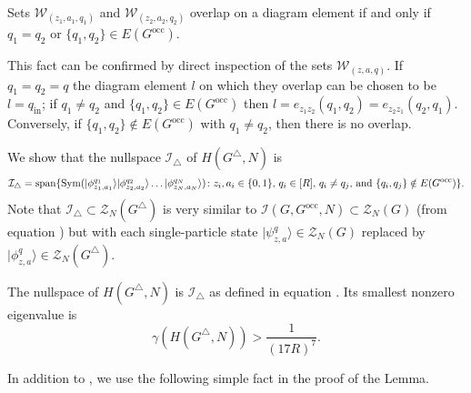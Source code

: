 \documentclass[../thesis-main/thesis-main]{subfiles}
\begin{document}
\begin{fact}
\label{fct:block_property}
Sets $\mathcal{W}_{(z_{1},a_{1},q_{1})}$ and $\mathcal{W}_{(z_{2},a_{2},q_{2})}$ overlap on a diagram element if and only if $q_{1}=q_{2}$ or $\{q_{1},q_{2}\}\in E(G^{\text{occ}})$.
\end{fact}
This fact can be confirmed by direct inspection of the sets $\mathcal{W}_{(z,a,q)}$. If $q_{1}=q_{2}=q$ the diagram element $l$ on which they overlap can be chosen to be $l=q_{\mathrm{in}}$; if $q_{1}\neq q_{2}$ and $\{q_{1},q_{2}\}\in E(G^{\text{occ}})$ then $l=e_{z_{1}z_{2}}(q_{1},q_{2})=e_{z_{2}z_{1}}(q_{2},q_{1})$.
Conversely, if $\{q_1,q_2\} \notin E(G^{\text{occ}})$ with $q_1 \ne q_2$, then there is no overlap.

We show that the nullspace $\mathcal{I}_{\triangle}$ of $H(G^{\triangle},N)$ is 
\begin{equation}
\mathcal{I}_{\triangle}=\operatorname{span}\{ \operatorname{Sym}(|\phi_{z_{1},a_{1}}^{q_{1}}\rangle|\phi_{z_{2},a_{2}}^{q_{2}}\rangle\ldots|\phi_{z_{N},a_{N}}^{q_{N}}\rangle)\colon 
\text{$z_{i},a_{i}\in\{0,1\}$, $q_{i}\in[R]$, $q_{i}\neq q_{j}$, and $\{q_{i},q_{j}\}\notin E(G^{\text{occ}})$}\}.
\label{eq:I_triangle}
\end{equation}
Note that $\mathcal{I}_{\triangle}\subset\mathcal{Z}_{N}(G^{\triangle})$ is very similar to $\mathcal{I}(G,G^{\text{occ}},N)\subset\mathcal{Z}_{N}(G)$ (from equation ) but with each single-particle state $|\psi_{z,a}^{q}\rangle\in\mathcal{Z}_{N}(G)$ replaced by $|\phi_{z,a}^{q}\rangle\in\mathcal{Z}_{N}(G^{\triangle})$.

\begin{lemma}
\label{lem:The-nullspace-of_H_triangle}The nullspace of $H(G^{\triangle},N)$ is $\mathcal{I}_{\triangle}$ as defined in equation . Its smallest nonzero eigenvalue is 
\begin{equation}
\gamma(H(G^{\triangle},N)) > \frac{1}{\left(17R\right)^{7}}.\label{eq:lowerbound_HG_triangle}
\end{equation}
\end{lemma}

In addition to , we use the following simple fact in the proof of the Lemma.
\end{document}
